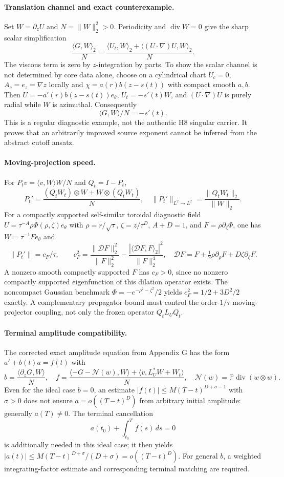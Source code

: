 \paragraph{Translation channel and exact counterexample.}
Set $W=\partial_zU$ and $N=\|W\|_2^2>0$. Periodicity and $\operatorname{div}W=0$ give the sharp scalar simplification
\[
\boxed{\quad
\frac{\langle G,W\rangle_2}{N}
=\frac{\langle U_t,W\rangle_2+\langle(U\cdot\nabla)U,W\rangle_2}{N}.
\quad}
\]
The viscous term is zero by $z$-integration by parts. To show the scalar channel is not determined by core data alone, choose on a cylindrical chart $U_c=0$, $A_c=e_z=\nabla z$ locally and
$\chi=a(r)b(z-s(t))$ with compact smooth $a,b$. Then
$U=-a'(r)b(z-s(t))e_\theta$, $U_t=-s'(t)W$, and $(U\cdot\nabla)U$ is purely radial while $W$ is azimuthal. Consequently
\[
\boxed{\qquad \langle G,W\rangle/N=-s'(t).\qquad}
\]
This is a regular diagnostic example, not the authentic H8 singular carrier. It proves that an arbitrarily improved source exponent cannot be inferred from the abstract cutoff ansatz.

\paragraph{Moving-projection speed.}
For $P_tv=\langle v,W\rangle W/N$ and $Q_t=I-P_t$,
\[
\boxed{\quad P_t'=
\frac{(Q_tW_t)\otimes W+W\otimes(Q_tW_t)}{N},
\quad \|P_t'\|_{L^2\to L^2}=\frac{\|Q_tW_t\|_2}{\|W\|_2}.\quad}
\]
For a compactly supported self-similar toroidal diagnostic field
$U=\tau^{-A}\rho\Phi(\rho,\zeta)e_\theta$ with
$\rho=r/\sqrt\tau$, $\zeta=z/\tau^D$, $A+D=1$, and
$F=\rho\partial_\zeta\Phi$, one has $W=\tau^{-1}F e_\theta$ and
\[
\|P_t'\|=c_F/\tau,\qquad
c_F^2=\frac{\|\mathcal DF\|_2^2}{\|F\|_2^2}
-\frac{|\langle\mathcal DF,F\rangle_2|^2}{\|F\|_2^4},
\quad \mathcal DF=F+\tfrac12\rho\partial_\rho F+D\zeta\partial_\zeta F.
\]
A nonzero smooth compactly supported $F$ has $c_F>0$, since no nonzero compactly supported eigenfunction of this dilation operator exists. The noncompact Gaussian benchmark $\Phi=-e^{-\rho^2-\zeta^2}/2$ yields $c_F^2=1/2+3D^2/2$ exactly. A complementary propagator bound must control the order-$1/\tau$ moving-projector coupling, not only the frozen operator $Q_tL_UQ_t$.

\paragraph{Terminal amplitude compatibility.}
The corrected exact amplitude equation from Appendix G has the form $a'+b(t)a=f(t)$ with
\[
b=\frac{\langle\partial_zG,W\rangle}{N},\quad
f=\frac{\langle-G-\mathcal N(w),W\rangle+
\langle v,L_U^*W+W_t\rangle}{N},\quad
\mathcal N(w)=\mathbb P\operatorname{div}(w\otimes w).
\]
Even for the ideal case $b=0$, an estimate
$|f(t)|\le M(T-t)^{D+\sigma-1}$ with $\sigma>0$ does not ensure
$a=o((T-t)^D)$ from arbitrary initial amplitude: generally $a(T)\ne0$.
The terminal cancellation
\[
\boxed{\quad a(t_0)+\int_{t_0}^T f(s)\,ds=0\quad}
\]
is additionally needed in this ideal case; it then yields
$|a(t)|\le M(T-t)^{D+\sigma}/(D+\sigma)=o((T-t)^D)$.
For general $b$, a weighted integrating-factor estimate and corresponding
terminal matching are required.


